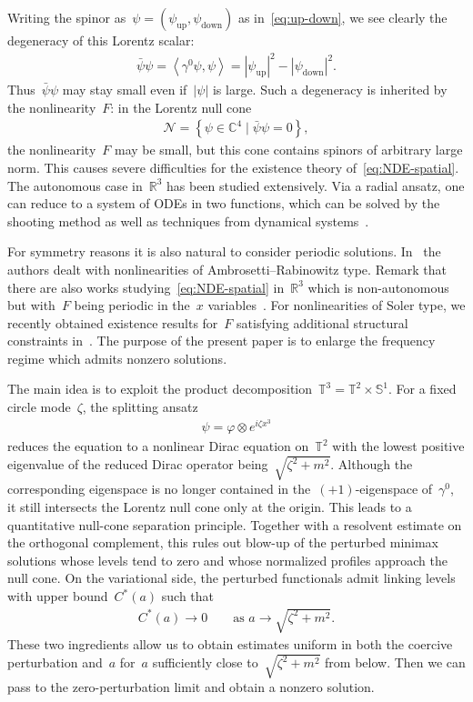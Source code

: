\documentclass[10pt,a4paper]{amsart}
\newcommand{\R}{\mathbb{R}}
\newcommand{\C}{\mathbb{C}}
\newcommand{\T}{\mathbb{T}}
\newcommand{\sph}{\mathbb{S}}
\newcommand{\Abracket}[1]{\left<#1\right>} %
\newcommand{\braces}[1]{\left\{#1\right\}} %
\DeclareMathOperator{\up}{up}
\DeclareMathOperator{\down}{down}
\begin{document}
Writing the spinor as~$\psi=(\psi_{\up},\psi_{\down})$ as in~\eqref{eq:up-down}, we see clearly the degeneracy of this Lorentz scalar:
\begin{align}
    \bar{\psi}\psi=\Abracket{\gamma^0\psi,\psi}
    =|\psi_{\up}|^2 - |\psi_{\down}|^2.
\end{align}
Thus~$\bar{\psi}\psi$ may stay small even if~$|\psi|$ is large. 
Such a degeneracy is inherited by the nonlinearity~$F$: 
in the Lorentz null cone
\begin{align}
    \mathcal{N}=\braces{\psi\in\C^4 \mid \bar{\psi}\psi=0}, 
\end{align}
the nonlinearity~$F$ may be small, but this cone contains spinors of arbitrary large norm. 
This causes severe difficulties for the existence theory of~\eqref{eq:NDE-spatial}.
The autonomous case in~$\R^3$ has been studied extensively.
Via a radial ansatz, one can reduce to a system of ODEs in two functions, which can be solved by the shooting method as well as techniques from dynamical systems~\cite{BalabaneCazenave1988Existence,Cazenave1986Existence, EstebanSere1995stationary,Merle1988Existence}.


For symmetry reasons it is also natural to consider periodic solutions. 
In~\cite{DingLiu2014periodic} the authors dealt with nonlinearities of Ambrosetti--Rabinowitz type. 
Remark that there are also works studying~\eqref{eq:NDE-spatial} in~$\R^3$ which is non-autonomous but with~$F$ being periodic in the~$x$ variables~\cite{BartschDing2006Solutions,DingLiu2015Periodic,DingLiu2017Periodic}. 
For nonlinearities of Soler type, we recently obtained existence results for~$F$ satisfying additional structural constraints in~\cite{WZ2026Stationary}. 
The purpose of the present paper is to enlarge the frequency regime which admits nonzero solutions.

The main idea is to exploit the product decomposition~$\T^3=\T^2\times\sph^1$.
For a fixed circle mode~$\zeta$, the splitting ansatz
\begin{align}
    \psi=\varphi\otimes e^{i\zeta x^3}
\end{align}
reduces the equation to a nonlinear Dirac equation on~$\T^2$ with the lowest positive eigenvalue of the reduced Dirac operator being~$\sqrt{\zeta^2+m^2}$.
Although the corresponding eigenspace is no longer contained in the~$(+1)$-eigenspace of~$\gamma^0$, it still intersects the Lorentz null cone only at the origin. 
This leads to a quantitative null-cone separation principle. 
Together with a resolvent estimate on the orthogonal complement, this rules out blow-up of the perturbed minimax solutions whose levels tend to zero and whose normalized profiles approach the null cone. 
On the variational side, the perturbed functionals admit linking levels with upper bound~$C^*(a)$ such that 
\begin{align}
    C^*(a)\to 0 \qquad\mbox{as }a\to \sqrt{\zeta^2+m^2}. 
\end{align}
These two ingredients allow us to obtain estimates uniform in both the
coercive perturbation and~$a$ for~$a$ sufficiently close to~$\sqrt{\zeta^2+m^2}$
from below. 
Then we can pass to the zero-perturbation limit and obtain a nonzero solution. 
\end{document}

